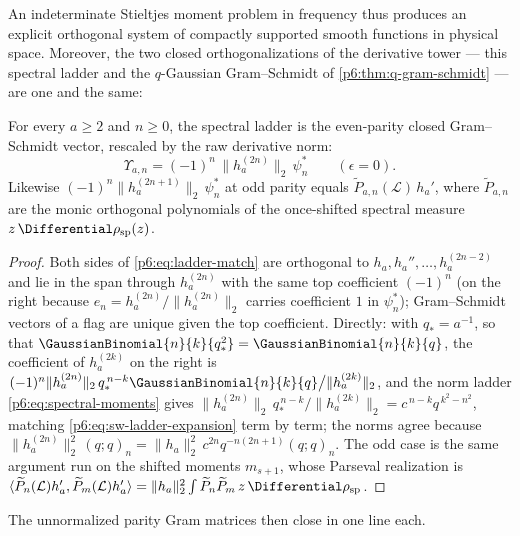 \documentclass[11pt,oneside]{article}
\numberwithin{equation}{section}
\theoremstyle{definition}
\theoremstyle{remark}
\begin{document}
An indeterminate Stieltjes moment problem in frequency thus produces an
explicit orthogonal system of compactly supported smooth functions in
physical space.  Moreover, the two closed orthogonalizations of the
derivative tower --- this spectral ladder and the $q$-Gaussian
Gram--Schmidt of \cref{p6:thm:q-gram-schmidt} --- are one and the same:

\begin{proposition}\label{p6:prop:ladder-match}
For every $a\ge2$ and $n\ge0$, the spectral ladder is the even-parity
closed Gram--Schmidt vector, rescaled by the raw derivative norm:
\begin{equation}\label{p6:eq:ladder-match}
 \boxed{\ \Upsilon_{a,n}
 =(-1)^n\,\bigl\|h_a^{(2n)}\bigr\|_2\,\psi_n^{\ast}
 \qquad(\epsilon=0).\ }
\end{equation}
Likewise $(-1)^n\|h_a^{(2n+1)}\|_2\,\psi_n^{\ast}$ at odd parity equals
$\widetilde P_{a,n}(\mathcal L)\,h_a'$, where $\widetilde P_{a,n}$ are the
monic orthogonal polynomials of the once-shifted spectral measure
$z\,\Differential\rho_{\mathrm{sp}}(z)$.
\end{proposition}

\begin{proof}
Both sides of \eqref{p6:eq:ladder-match} are orthogonal to
$h_a,h_a'',\ldots,h_a^{(2n-2)}$ and lie in the span through $h_a^{(2n)}$
with the same top coefficient $(-1)^n$ (on the right because
$e_n=h_a^{(2n)}/\|h_a^{(2n)}\|_2$ carries coefficient $1$ in
$\psi_n^{\ast}$); Gram--Schmidt vectors of a flag are unique given the top
coefficient.  Directly: with $q_\ast=a^{-1}$, so that
$\GaussianBinomial{n}{k}{q_\ast^2}=\GaussianBinomial{n}{k}{q}$, the coefficient of $h_a^{(2k)}$ on the
right is $(-1)^n\|h_a^{(2n)}\|_2\,q_\ast^{\,n-k}\GaussianBinomial{n}{k}{q}\big/
\|h_a^{(2k)}\|_2$, and the norm ladder \eqref{p6:eq:spectral-moments} gives
$\|h_a^{(2n)}\|_2\,q_\ast^{\,n-k}/\|h_a^{(2k)}\|_2=c^{\,n-k}q^{\,k^2-n^2}$,
matching \eqref{p6:eq:sw-ladder-expansion} term by term; the norms agree
because $\|h_a^{(2n)}\|_2^2\,(q;q)_n
=\|h_a\|_2^2\,c^{2n}q^{-n(2n+1)}(q;q)_n$.  The odd case is the same
argument run on the shifted moments $m_{s+1}$, whose Parseval realization
is $\langle\widetilde P_n(\mathcal L)h_a',\widetilde P_m(\mathcal
L)h_a'\rangle=\|h_a\|_2^2\int\widetilde P_n\widetilde P_m\,z\,
\Differential\rho_{\mathrm{sp}}$.
\end{proof}

The unnormalized parity Gram matrices then close in one line each.
\end{document}
